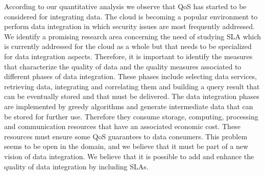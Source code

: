 According to our quantitative analysis we observe that QoS has started to be
considered for integrating data. 
 The cloud is becoming a popular environment to
perform data integration in which security issues are most frequently addressed.
We identify a promising research area concerning the need of studying SLA which
is currently addressed  for the cloud as a whole \cite{PedrinaciCL14} but that
needs to be specialized for data integration aspects. Therefore, it is important
to identify the measures that characterize the quality of data and  the
quality measures associated to different phases of data integration. These phases include selecting
data services, retrieving data, integrating and correlating them and building a
query result that can be eventually stored and that must be delivered. The data integration phases are implemented by greedy algorithms and generate intermediate data that
can be stored for further use. Therefore they consume storage, computing,
processing and communication resources that have an associated economic cost. These resources 
 must ensure some QoS guarantees to data consumers. This problem seems to be
open in the domain, and we believe that it must be part of  a new vision of data
integration. We believe that it is possible to add and enhance the quality of
data integration by including SLAs.                   


% 
